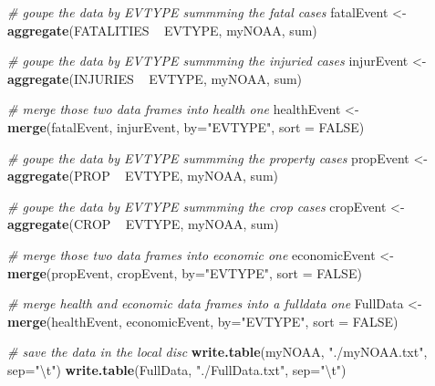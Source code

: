 \documentclass[12pt,spanish, american,b4paper, onecolumn, lmargin=1cm, rmargin=1cm, tmargin=1cm, bmargin=2cm,]{article}
\newenvironment{Shaded}{}{}
\newcommand{\KeywordTok}[1]{\textbf{{#1}}}
\newcommand{\DataTypeTok}[1]{\textcolor[rgb]{0.50,0.00,0.00}{{#1}}}
\newcommand{\CharTok}[1]{\textcolor[rgb]{1.00,0.00,1.00}{{#1}}}
\newcommand{\StringTok}[1]{\textcolor[rgb]{0.87,0.00,0.00}{{#1}}}
\newcommand{\CommentTok}[1]{\textcolor[rgb]{0.50,0.50,0.50}{\textit{{#1}}}}
\newcommand{\OtherTok}[1]{{#1}}
\newcommand{\NormalTok}[1]{{#1}}
\begin{document}
\begin{Shaded}
\begin{Highlighting}[]
\CommentTok{# goupe the data by EVTYPE summming the fatal cases}
\NormalTok{fatalEvent <-}\StringTok{ }\KeywordTok{aggregate}\NormalTok{(FATALITIES ~}\StringTok{ }\NormalTok{EVTYPE, myNOAA, sum)}

\CommentTok{# goupe the data by EVTYPE summming the injuried cases}
\NormalTok{injurEvent <-}\StringTok{ }\KeywordTok{aggregate}\NormalTok{(INJURIES ~}\StringTok{ }\NormalTok{EVTYPE, myNOAA, sum)}

\CommentTok{# merge those two data frames into health one}
\NormalTok{healthEvent <-}\StringTok{ }\KeywordTok{merge}\NormalTok{(fatalEvent, injurEvent, }\DataTypeTok{by=}\StringTok{"EVTYPE"}\NormalTok{, }\DataTypeTok{sort =} \OtherTok{FALSE}\NormalTok{)}

\CommentTok{# goupe the data by EVTYPE summming the property cases}
\NormalTok{propEvent <-}\StringTok{ }\KeywordTok{aggregate}\NormalTok{(PROP ~}\StringTok{ }\NormalTok{EVTYPE, myNOAA, sum)}

\CommentTok{# goupe the data by EVTYPE summming the crop cases}
\NormalTok{cropEvent <-}\StringTok{ }\KeywordTok{aggregate}\NormalTok{(CROP ~}\StringTok{ }\NormalTok{EVTYPE, myNOAA, sum)}

\CommentTok{# merge those two data frames into economic one}
\NormalTok{economicEvent <-}\StringTok{ }\KeywordTok{merge}\NormalTok{(propEvent, cropEvent, }\DataTypeTok{by=}\StringTok{"EVTYPE"}\NormalTok{, }\DataTypeTok{sort =} \OtherTok{FALSE}\NormalTok{)}

\CommentTok{# merge health and economic data frames into a fulldata one}
\NormalTok{FullData <-}\StringTok{ }\KeywordTok{merge}\NormalTok{(healthEvent, economicEvent, }\DataTypeTok{by=}\StringTok{"EVTYPE"}\NormalTok{, }\DataTypeTok{sort =} \OtherTok{FALSE}\NormalTok{)}

\CommentTok{# save the data in the local disc}
\KeywordTok{write.table}\NormalTok{(myNOAA, }\StringTok{"./myNOAA.txt"}\NormalTok{, }\DataTypeTok{sep=}\StringTok{"}\CharTok{\textbackslash{}t}\StringTok{"}\NormalTok{)}
\KeywordTok{write.table}\NormalTok{(FullData, }\StringTok{"./FullData.txt"}\NormalTok{, }\DataTypeTok{sep=}\StringTok{"}\CharTok{\textbackslash{}t}\StringTok{"}\NormalTok{)}
\end{Highlighting}
\end{Shaded}
\end{document}
